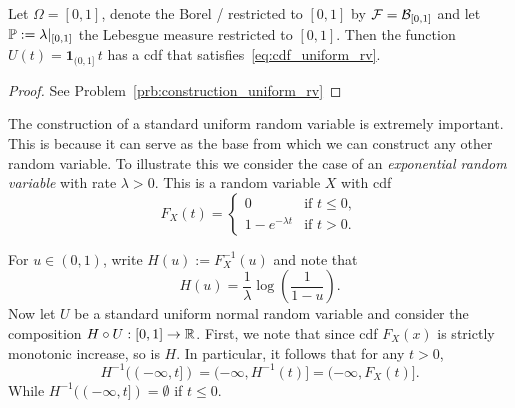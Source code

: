 \begin{lemma}\label{lem:uniform_random_variable}
Let $\Omega = [0,1]$, denote the Borel \sigalg/ restricted to $[0,1]$ by $\mathcal F = \mathcal B_{[0,1]}$ and let $\mathbb P := \lambda|_{[0,1]}$ the Lebesgue measure restricted to $[0,1]$. Then the function $U(t) = \mathbf{1}_{(0,1]} \, t$ has a cdf that satisfies~\eqref{eq:cdf_uniform_rv}.
\end{lemma}

\begin{proof}
See Problem~\ref{prb:construction_uniform_rv}

\end{proof}

The construction of a standard uniform random variable is extremely important. This is because it can serve as the base from which we can construct any other random variable. To illustrate this we consider the case of an \emph{exponential random variable} with rate $\lambda > 0$. This is a random variable $X$ with cdf
\[
	F_X(t) = \begin{cases}
		0 &\text{if } t \le 0,\\
		1-e^{-\lambda t} &\text{if } t > 0.
	\end{cases}
\]

For $u \in (0,1)$, write $H(u) := F_X^{-1}(u)$ and note that
\[
	H(u) = \frac{1}{\lambda} \log\left(\frac{1}{1-u}\right).
\]
Now let $U$ be a standard uniform normal random variable and consider the composition $H \circ U : [0,1] \to \mathbb R$. First, we note that since cdf $F_X(x)$ is strictly monotonic increase, so is $H$. In particular, it follows that for any $t > 0$,
\[
	H^{-1}((-\infty,t]) = (-\infty, H^{-1}(t)] = (-\infty, F_X(t)].
\]
While $H^{-1}((-\infty,t]) = \emptyset$ if $t \le 0$.


